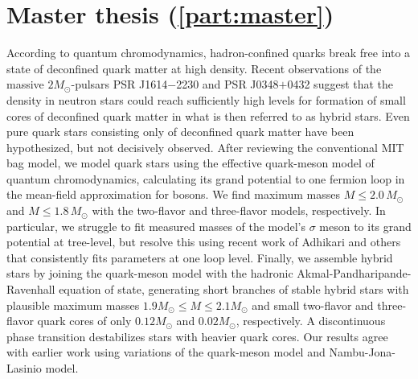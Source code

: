 \section*{Master thesis (\cref{part:master})}

According to quantum chromodynamics,
hadron-confined quarks break free into a state of deconfined quark matter at high density.
Recent observations of the massive $2 M_\odot$-pulsars PSR J1614$-$2230 and PSR J0348$+$0432
suggest that the density in neutron stars could reach sufficiently high levels
for formation of small cores of deconfined quark matter in what is then referred to as hybrid stars.
Even pure quark stars consisting only of deconfined quark matter have been hypothesized, but not decisively observed.
After reviewing the conventional MIT bag model,
we model quark stars using the effective quark-meson model of quantum chromodynamics,
calculating its grand potential to one fermion loop in the mean-field approximation for bosons.
We find maximum masses $M \leq 2.0 \, M_\odot$ and $M \leq 1.8 \, M_\odot$ with the two-flavor and three-flavor models, respectively.
In particular, we struggle to fit measured masses 
of the model's $\sigma$ meson to its grand potential at tree-level,
but resolve this using recent work of Adhikari and others that consistently fits parameters at one loop level.
Finally, we assemble hybrid stars by joining the quark-meson model with the hadronic Akmal-Pandharipande-Ravenhall equation of state,
generating short branches of stable hybrid stars with plausible maximum masses $1.9 M_\odot \leq M \leq 2.1 M_\odot$
and small two-flavor and three-flavor quark cores of only $0.12 M_\odot$ and $0.02 M_\odot$, respectively.
A discontinuous phase transition destabilizes stars with heavier quark cores.
Our results agree with earlier work using variations of the quark-meson model and Nambu-Jona-Lasinio model.
